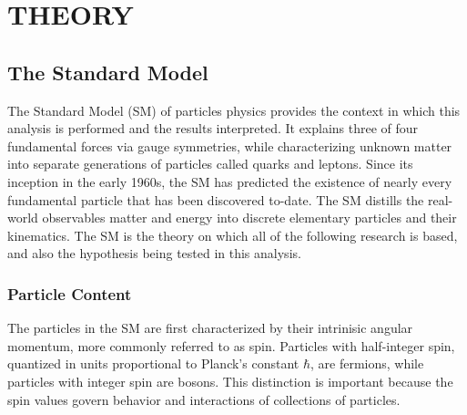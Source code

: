 %
%

\chapter{THEORY}
\section{The Standard Model}
The Standard Model (SM) of particles physics provides the context in which this analysis is performed and the results interpreted. 
It explains three of four fundamental forces via gauge symmetries, while characterizing unknown matter into
separate generations of particles called quarks and leptons. Since its inception in the early 1960s, the SM has predicted the existence of nearly every fundamental particle that has been discovered to-date.
The SM distills the real-world observables matter and energy into discrete elementary particles and their kinematics. The SM is the theory on which all of the following research is based, and also the hypothesis being tested in this analysis.

\subsection{Particle Content}
The particles in the SM are first characterized by their intrinisic angular momentum, more commonly referred to as spin. Particles with half-integer spin, quantized in units proportional to Planck's constant $\hbar$, are fermions, while particles with integer spin are bosons.
This distinction is important because the spin values govern behavior and interactions of collections of particles. 

